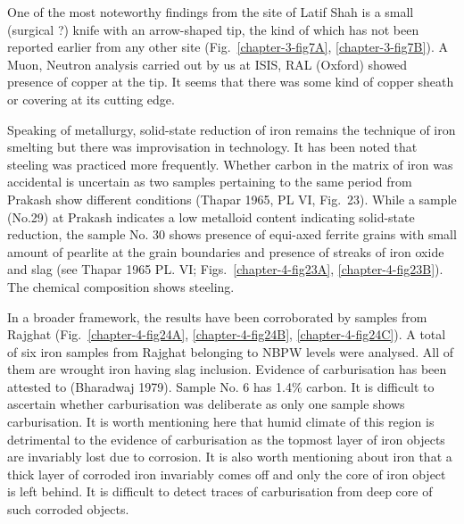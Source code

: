 One of the most noteworthy findings from the site of Latif Shah is a small (surgical ?) knife with an arrow-shaped tip, the kind of which has not been reported earlier from any other site (Fig.~\ref{chapter-3-fig7A}, \ref{chapter-3-fig7B}). A Muon, Neutron analysis carried out by us at ISIS, RAL (Oxford) showed presence of copper at the tip. It seems that there was some kind of copper sheath or covering at its cutting edge. 

Speaking of metallurgy, solid-state reduction of iron remains the technique of iron smelting but there was improvisation in technology. It has been noted that steeling was practiced more frequently. Whether carbon in the matrix of iron was accidental is uncertain as two samples pertaining to the same period from Prakash show different conditions (Thapar 1965, PL VI, Fig.~23). While a sample (No.29) at Prakash indicates a low metalloid content indicating solid-state reduction, the sample No. 30 shows presence of equi-axed ferrite grains with small amount of pearlite at the grain boundaries and presence of streaks of iron oxide and slag (see Thapar 1965 PL. VI; Figs.~\ref{chapter-4-fig23A}, \ref{chapter-4-fig23B}). The chemical composition shows steeling.


In a broader framework, the results have been corroborated by samples from Rajghat (Fig.~\ref{chapter-4-fig24A}, \ref{chapter-4-fig24B}, \ref{chapter-4-fig24C}). A total of six iron samples from Rajghat belonging to NBPW levels were analysed. All of them are wrought iron having slag inclusion. Evidence of carburisation has been attested to (Bharadwaj 1979). Sample No. 6 has 1.4\% carbon. It is difficult to ascertain whether carburisation was deliberate as only one sample shows carburisation. It is worth mentioning here that humid climate of this region is detrimental to the evidence of carburisation as the topmost layer of iron objects are invariably lost due to corrosion. It is also worth mentioning about iron that a thick layer of corroded iron invariably comes off and only the core of iron object is left behind. It is difficult to detect traces of carburisation from deep core of such corroded objects.

